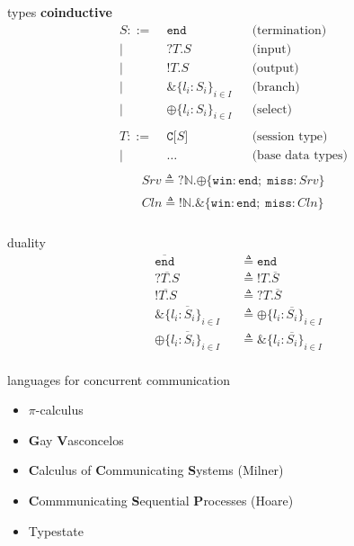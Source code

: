 \documentclass[dvipsnames]{beamer}
\newcommand{\sitem}{\item[\raisebox{.45ex}{\rule{.6ex}{.6ex}}]}
\newcommand{\picalc}{$\pi$-calculus}
\newcommand{\type}[1]{\mathtt{#1}}
\newcommand{\tend}[0]{\type{end}}
\newcommand{\trecv}[1]{\type{?} #1 \type{.}}
\newcommand{\tsend}[1]{\type{!} #1 \type{.}}
\newcommand{\tbranch}[2]{\type{\&} \{ #1 \}_{#2}}
\newcommand{\tselect}[2]{\type{\oplus} \{ #1 \}_{#2}}
\newcommand{\tchan}[1]{\type{C[} #1 \type{]}}
\newcommand{\dual}[1]{\overline{#1}}
\newcommand{\is}[0]{\triangleq}
\begin{document}
  \begin{frame}{types}
    \textbf{coinductive}
    \setlength{\abovedisplayskip}{0pt}
    \setlength{\belowdisplayskip}{0pt}
    \setlength{\abovedisplayshortskip}{0pt}
    \setlength{\belowdisplayshortskip}{0pt}
    \begin{align*}
      S ::=& \; \tend      &&\text{(termination)}    \\ 
      |& \; \trecv{T}S     &&\text{(input)}       \\ 
      |& \; \tsend{T}S     &&\text{(output)}       \\           
      |& \; \tbranch{l_i : S_i}{i \in I} &&\text{(branch)}       \\ 
      |& \; \tselect{l_i : S_i}{i \in I} &&\text{(select)}       \\           
      \\
      T ::=& \; \tchan{S} &&\text{(session type)} \\
      | & \; \ldots       &&\text{(base data types)} \\
    \end{align*}
    \begin{align*}
      Srv \is \trecv{\mathtt{\mathbb{N}}} \tselect{\mathtt{win} : \tend ; \; \mathtt{miss} : Srv}{} \\
      Cln \is \tsend{\mathtt{\mathbb{N}}} \tbranch{\mathtt{win} : \tend ; \; \mathtt{miss} : Cln}{} \\
    \end{align*}
  \end{frame}

  \begin{frame}{duality}
    \begin{equation*}
      \begin{aligned}
        &\dual{\tend}          &&\is \tend\\
        &\dual{\trecv{T}S}     &&\is \tsend{T}\dual{S}\\
        &\dual{\tsend{T}S}     &&\is \trecv{T}\dual{S}\\
        &\dual{\tbranch{l_i : S_i}{i \in I}} &&\is \tselect{l_i : \dual{S_i}}{i \in I}\\
        &\dual{\tselect{l_i : S_i}{i \in I}} &&\is \tbranch{l_i : \dual{S_i}}{i \in I}\\
      \end{aligned}
    \end{equation*}
  \end{frame}

  \begin{frame}{languages for concurrent communication}
    \begin{itemize}
      \setlength\itemsep{1em}
      \sitem \picalc{}
      \sitem \textbf{G}ay \textbf{V}asconcelos
      \sitem \textbf{C}alculus of \textbf{C}ommunicating \textbf{S}ystems (Milner)
      \sitem \textbf{C}ommmunicating \textbf{S}equential \textbf{P}rocesses (Hoare)
      \sitem Typestate
    \end{itemize}
  \end{frame}
  
\end{document}
